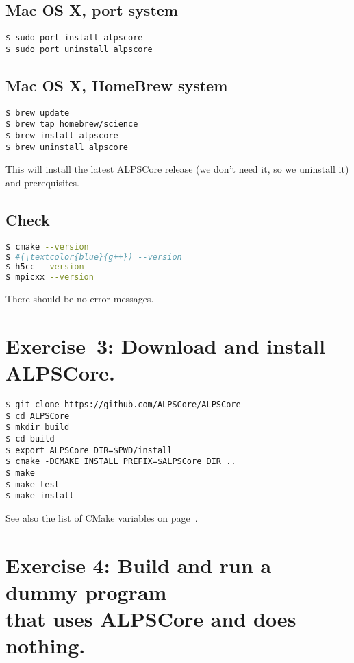 \documentclass[12pt]{article}
\begin{document}
\subsection*{Mac OS X, port system}
\begin{lstlisting}[emph={port,sudo}]
$ sudo port install alpscore
$ sudo port uninstall alpscore
\end{lstlisting}%
\subsection*{Mac OS X, HomeBrew system}
\begin{lstlisting}[emph={brew}]
$ brew update
$ brew tap homebrew/science
$ brew install alpscore
$ brew uninstall alpscore
\end{lstlisting}%

This will install the latest ALPSCore release (we don't need it, so we
uninstall it) and prerequisites.

\subsection*{Check}
\begin{lstlisting}[language=sh,basicstyle=\ttfamily\small,emph={cmake,gcc,h5cc,mpicxx}]
$ cmake --version
$ #(\textcolor{blue}{g++}) --version
$ h5cc --version
$ mpicxx --version
\end{lstlisting}

There should be no error messages.

\section*{Exercise~3: Download and install ALPSCore.}
\begin{lstlisting}[emph={git,export,cmake,make,cd,mkdir}]
$ git clone https://github.com/ALPSCore/ALPSCore
$ cd ALPSCore
$ mkdir build
$ cd build
$ export ALPSCore_DIR=$PWD/install
$ cmake -DCMAKE_INSTALL_PREFIX=$ALPSCore_DIR ..
$ make
$ make test
$ make install
\end{lstlisting}%

See also the list of CMake variables on page~\pageref{ref:cmakevars}.

\section*{Exercise 4: Build and run a dummy program\\ that uses ALPSCore and does nothing.}
\end{document}
